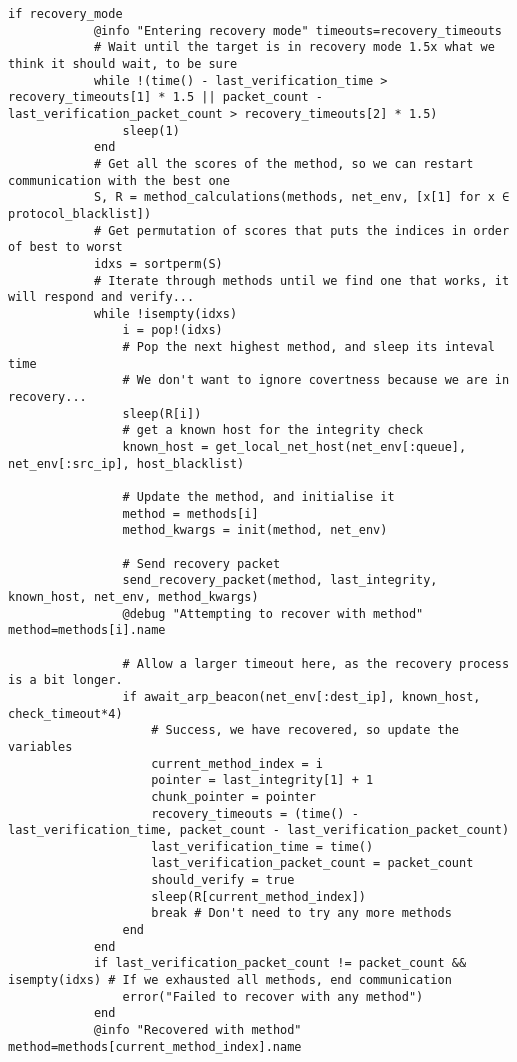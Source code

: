 \begin{lstlisting}[language=JuliaLocal, style=julia]
        if recovery_mode
            @info "Entering recovery mode" timeouts=recovery_timeouts
            # Wait until the target is in recovery mode 1.5x what we think it should wait, to be sure
            while !(time() - last_verification_time > recovery_timeouts[1] * 1.5 || packet_count - last_verification_packet_count > recovery_timeouts[2] * 1.5)
                sleep(1)
            end
            # Get all the scores of the method, so we can restart communication with the best one
            S, R = method_calculations(methods, net_env, [x[1] for x ∈ protocol_blacklist])
            # Get permutation of scores that puts the indices in order of best to worst 
            idxs = sortperm(S)
            # Iterate through methods until we find one that works, it will respond and verify...
            while !isempty(idxs)
                i = pop!(idxs)
                # Pop the next highest method, and sleep its inteval time
                # We don't want to ignore covertness because we are in recovery...
                sleep(R[i])
                # get a known host for the integrity check
                known_host = get_local_net_host(net_env[:queue], net_env[:src_ip], host_blacklist)

                # Update the method, and initialise it
                method = methods[i]
                method_kwargs = init(method, net_env)

                # Send recovery packet
                send_recovery_packet(method, last_integrity, known_host, net_env, method_kwargs)
                @debug "Attempting to recover with method" method=methods[i].name
                
                # Allow a larger timeout here, as the recovery process is a bit longer.
                if await_arp_beacon(net_env[:dest_ip], known_host, check_timeout*4)
                    # Success, we have recovered, so update the variables
                    current_method_index = i
                    pointer = last_integrity[1] + 1
                    chunk_pointer = pointer
                    recovery_timeouts = (time() - last_verification_time, packet_count - last_verification_packet_count)
                    last_verification_time = time()
                    last_verification_packet_count = packet_count
                    should_verify = true
                    sleep(R[current_method_index])
                    break # Don't need to try any more methods
                end
            end
            if last_verification_packet_count != packet_count && isempty(idxs) # If we exhausted all methods, end communication
                error("Failed to recover with any method")
            end
            @info "Recovered with method" method=methods[current_method_index].name


\end{lstlisting}
